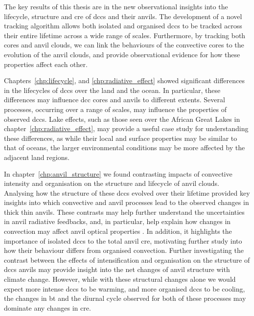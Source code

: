 The key results of this thesis are in the new observational insights into the lifecycle, structure and \acrshort{cre} of \acrshort{dcc}s and their anvils.
The development of a novel tracking algorithm allows both isolated and organised \acrshort{dcc}s to be tracked across their entire lifetime across a wide range of scales.
Furthermore, by tracking both cores and anvil clouds, we can link the behaviours of the convective cores to the evolution of the anvil clouds, and provide observational evidence for how these properties affect each other.

Chapters~\ref{chp:lifecycle}, and \ref{chp:radiative_effect} showed significant differences in the lifecycles of \acrshort{dcc}s over the land and the ocean.
In particular, these differences may influence \acrshort{dcc} cores and anvils to different extents.
Several processes, occurring over a range of scales, may influence the properties of observed \acrshort{dcc}s.
Lake effects, such as those seen over the African Great Lakes in chapter~\ref{chp:radiative_effect}, may provide a useful case study for understanding these differences, as while their local and surface properties may be similar to that of oceans, the larger environmental conditions may be more affected by the adjacent land regions.

In chapter~\ref{chp:anvil_structure} we found contrasting impacts of convective intensity and organisation on the structure and lifecycle of anvil clouds. 
Analysing how the structure of these \acrshort{dcc}s evolved over their lifetime provided key insights into which convective and anvil processes lead to the observed changes in thick thin anvils.
These contrasts may help further understand the uncertainties in anvil radiative feedbacks, and, in particular, help explain how changes in convection may affect anvil optical properties \citep{mckim_weak_2024}.
In addition, it highlights the importance of isolated \acrshort{dcc}s to the total anvil \acrshort{cre}, motivating further study into how their behaviour differs from organised convection.
Further investigating the contrast between the effects of intensification and organisation on the structure of \acrshort{dcc}s anvils may provide insight into the net changes of anvil structure with climate change. However, while with these structural changes alone we would expect more intense \acrshort{dcc}s to be warming, and more organised \acrshort{dcc}s to be cooling, the changes in \acrshort{bt} and the diurnal cycle observed for both of these processes may dominate any changes in \acrshort{cre}.

